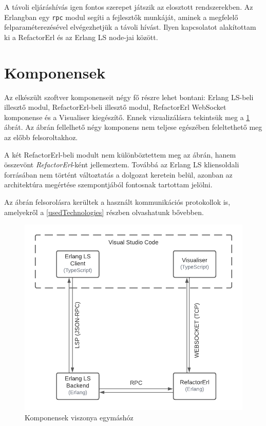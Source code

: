 A távoli eljáráshívás igen fontos szerepet játszik az elosztott rendszerekben. Az Erlangban egy \lstinline{rpc} modul segíti a fejlesztők munkáját, aminek a megfelelő felparaméterezésével elvégezhetjük a távoli hívást. Ilyen kapcsolatot alakítottam ki a RefactorErl és az Erlang LS node-jai között.



\section{Komponensek}

Az elkészült szoftver komponenseit négy fő részre lehet bontani: Erlang LS-beli illesztő modul, RefactorErl-beli illesztő modul, RefactorErl WebSocket komponense és a Visualiser kiegészítő. Ennek vizualizálásra tekintsük meg a \ref{fig:architecture} ábrát. Az ábrán fellelhető négy komponens nem teljese egészében feleltethető meg az előbb felsoroltakhoz.

A két RefactorErl-beli modult nem különböztettem meg az ábrán, hanem összevönt \textit{RefactorErl}-ként jellemeztem. Továbbá az Erlang LS kliensoldali forrásában nem történt változtatás a dolgozat keretein belül, azonban az architektúra megértése szempontjából fontosnak tartottam jelölni.

Az ábrán felsorolásra kerültek a használt kommunikációs protokollok is, amelyekről a \ref{usedTechnologies} részben olvashatunk bővebben.

\begin{figure}[H]
  \centering
  \includegraphics[width=0.8\linewidth]{images/architecture.png}
  \caption{Komponensek viszonya egymáshóz}
  \label{fig:architecture}
\end{figure}

